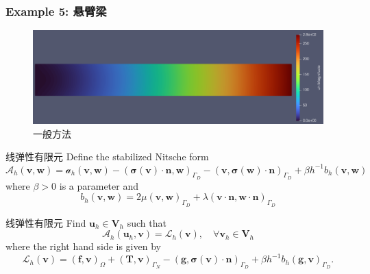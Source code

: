 \documentclass[lang=en,aspectratio=43,theme=default,logo=on]{simplebeamer}
\begin{document}
\begin{frame}[fragile]
    \frametitle{Example 5: 悬臂梁}
    \begin{figure}
        \centering %
        \includegraphics[width=1\textwidth]{./img/016.png}
        \caption{一般方法}
    \end{figure}
\end{frame}

\begin{frame}{线弹性有限元}
    Define the stabilized Nitsche form
    \begin{equation*}
        \mathcal{A}_h(\mathbf{v},\mathbf{w})=\mathcal{a}_h(\mathbf{v},\mathbf{w})-\left(\boldsymbol{\sigma}(\mathbf{v})\cdot\mathbf{n}, \mathbf{w} \right)_{\Gamma_D} - \left(\mathbf{v}, \boldsymbol{\sigma}(\mathbf{w})\cdot\mathbf{n}\right)_{\Gamma_D} + \beta h^{-1}b_h(\mathbf{v},\mathbf{w})
    \end{equation*}
    where $\beta > 0$ is a parameter and
    \begin{equation*}
        b_h(\mathbf{v}, \mathbf{w})=2\mu\left(  \mathbf{v}, \mathbf{w} \right)_{\Gamma_D} + \lambda\left( \mathbf{v} \cdot \mathbf{n}, \mathbf{w} \cdot \mathbf{n} \right)_{\Gamma_D}
    \end{equation*}

\end{frame}

\begin{frame}{线弹性有限元}
    Find $\mathbf{u}_h \in \mathbf{V}_h$ such that
    \begin{equation*}
        \mathcal{A}_h(\mathbf{u}_h, \mathbf{v})=\mathcal{L}_h(\mathbf{v}), \quad \forall\mathbf{v}_h \in \mathbf{V}_h
    \end{equation*}
    where the right hand side is given by
    \begin{equation*}
        \mathcal{L}_h(\mathbf{v})=\left( \mathbf{f} , \mathbf{v}\right)_\Omega + \left( \mathbf{T} , \mathbf{v}\right)_{\Gamma_N} - \left( \mathbf{g}, \boldsymbol{\sigma}(\mathbf{v}) \cdot \mathbf{n} \right)_{\Gamma_D} + \beta h^{-1}b_h\left(\mathbf{g}, \mathbf{v}  \right)_{\Gamma_D}.
    \end{equation*}
\end{frame}
\end{document}
